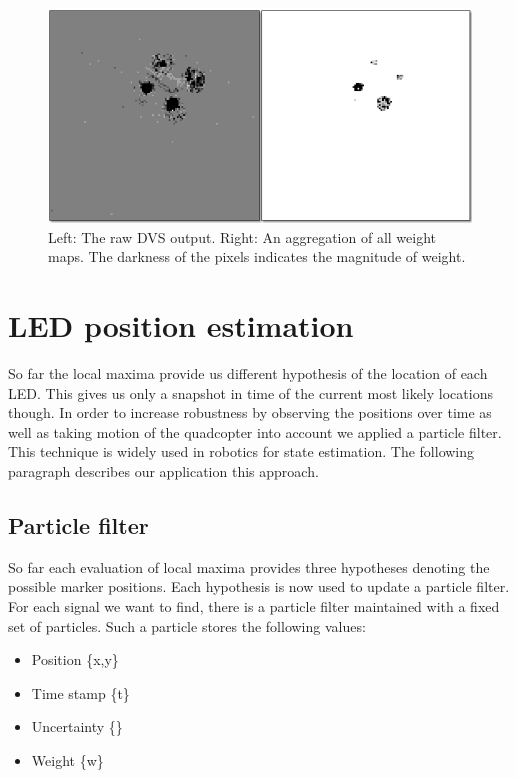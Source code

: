 \begin{figure}[h]
     \centering
     \includegraphics[width=1.0\textwidth]{img/dvs_weights.png}
     \caption{Left: The raw DVS output. Right: An aggregation of all weight maps. The darkness of the pixels indicates the magnitude of weight.}
     \label{img:dvs_weights}
\end{figure}

\section{LED position estimation}\label{sec:positionestimation}

So far the local maxima provide us different hypothesis of the location of each LED. This gives us only a snapshot in time of the current most likely locations though. In order to increase robustness by observing the positions over time as well as taking motion of the quadcopter into account we applied a particle filter. This technique is widely used in robotics for state estimation. The following paragraph describes our application this approach.


\subsection{Particle filter}\label{sec:particlefilter}

So far each evaluation of local maxima provides three hypotheses denoting the possible marker positions. Each hypothesis is now used to update a particle filter. For each signal we want to find, there is a particle filter maintained with a fixed set of particles. Such a particle stores the following values:

\begin{itemize}
	\item Position \{x,y\}
	\item Time stamp \{t\}
	\item Uncertainty \{\sigma \}
	\item Weight	\{w\}
\end{itemize}

